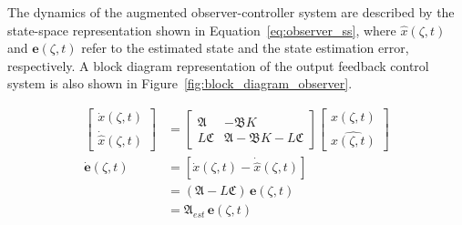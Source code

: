 The dynamics of the augmented observer-controller system are described by the state-space representation shown in Equation~\ref{eq:observer_ss}, where $\hat{x}(\zeta, t)$ and $\mathbf{e}(\zeta, t)$ refer to the estimated state and the state estimation error, respectively. A block diagram representation of the output feedback control system is also shown in Figure~\ref{fig:block_diagram_observer}.

\begin{equation}
    \begin{aligned} \label{eq:observer_ss}
        \left[\begin{array}{c}
            \dot{x}(\zeta,t) \\ \hline \dot{\hat{x}}(\zeta,t)
        \end{array}\right] &= 
        \left[
            \begin{array}{c|c}
                \mathfrak{A} & -\mathfrak{B} K \\ \hline
                L \mathfrak{C} & \mathfrak{A} - \mathfrak{B} K - L \mathfrak{C}
            \end{array}
        \right]
        \left[ \begin{array}{c}
            x(\zeta,t) \\ \hline \hat{x(\zeta,t)} \end{array}
            \right] \\
        \dot{\mathbf{e}}(\zeta,t) &= \left[ \dot{x}(\zeta,t) - \dot{\hat{x}}(\zeta,t) \right] \\
        &= (\mathfrak{A} - L \mathfrak{C}) \, \mathbf{e}(\zeta,t) \\
        &= \mathfrak{A}_{est} \, \mathbf{e}(\zeta,t)
    \end{aligned}
\end{equation}
